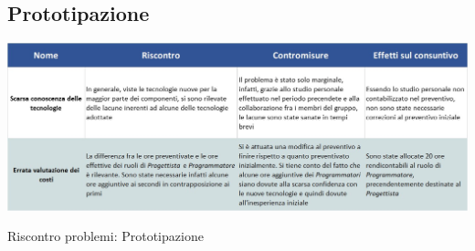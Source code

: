 \subsection{Prototipazione}
\begin{table}[h!]
	\centerline{\includegraphics[scale=0.55]{img/Rischi/RiscontroProblemi-Prototipazione.jpg}}
	\caption{Riscontro problemi: Prototipazione}
\end{table}